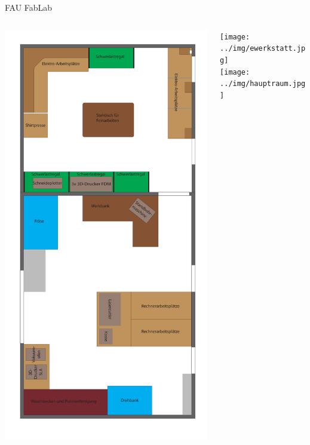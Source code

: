 \documentclass[t]{beamer}
\begin{document}
\begin{frame}{FAU FabLab}
    \begin{columns}
        \begin{column}[T]{0.25\textwidth}
            \includegraphics[height=0.9\textheight]{../img/fablabplan.pdf}
        \end{column}
        \begin{column}[T]{0.7\textwidth}
            \texttt{[image: ../img/ewerkstatt.jpg]}\\
            \texttt{[image: ../img/hauptraum.jpg]}
        \end{column}
    \end{columns}
\end{frame}
\end{document}
